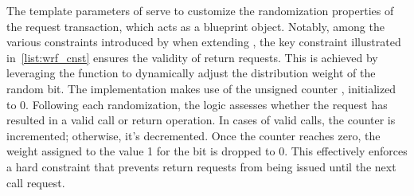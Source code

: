 \begin{description}
    The template parameters of  serve to customize the randomization properties of the request transaction, which acts as a blueprint object. Notably, among the various constraints introduced by  when extending , the key constraint illustrated in~\cref{list:wrf_cnst} ensures the validity of return requests. This is achieved by leveraging the  function to dynamically adjust the distribution weight of the  random bit. The implementation makes use of the unsigned counter , initialized to 0. Following each randomization, the  logic assesses whether the request has resulted in a valid call or return operation. In cases of valid calls, the counter is incremented; otherwise, it's decremented. Once the counter reaches zero, the weight assigned to the value 1 for the  bit is dropped to 0. This effectively enforces a hard constraint that prevents return requests from being issued until the next call request.
\end{description}